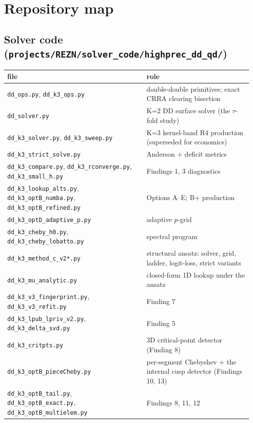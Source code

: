\chapter{Repository map}

\section{Solver code (\texttt{projects/REZN/solver\_code/highprec\_dd\_qd/})}
\begin{center}\small\begin{tabularx}{\linewidth}{lX}\toprule
file & role \\
\midrule
\texttt{dd\_ops.py}, \texttt{dd\_k3\_ops.py} & double-double primitives; exact CRRA clearing bisection \\
\texttt{dd\_solver.py} & K=2 DD surface solver (the $\tau$-fold study) \\
\texttt{dd\_k3\_solver.py}, \texttt{dd\_k3\_sweep.py} & K=3 kernel-band R4 production (superseded for economics) \\
\texttt{dd\_k3\_strict\_solve.py} & \strict{} Anderson + deficit metrics \\
\texttt{dd\_k3\_compare.py}, \texttt{dd\_k3\_rconverge.py}, \texttt{dd\_k3\_small\_h.py} & Findings 1, 3 diagnostics \\
\texttt{dd\_k3\_lookup\_alts.py}, \texttt{dd\_k3\_optB\_numba.py}, \texttt{dd\_k3\_optB\_refined.py} & Options A--E; B+ production \\
\texttt{dd\_k3\_optD\_adaptive\_p.py} & adaptive $p$-grid \\
\texttt{dd\_k3\_cheby\_h0.py}, \texttt{dd\_k3\_cheby\_lobatto.py} & spectral program \\
\texttt{dd\_k3\_method\_c\_v2*.py} & structural ansatz: solver, grid, ladder, logit-loss, strict variants \\
\texttt{dd\_k3\_mu\_analytic.py} & closed-form 1D lookup under the ansatz \\
\texttt{dd\_k3\_v3\_fingerprint.py}, \texttt{dd\_k3\_v3\_refit.py} & Finding 7 \\
\texttt{dd\_k3\_lpub\_lpriv\_v2.py}, \texttt{dd\_k3\_delta\_svd.py} & Finding 5 \\
\texttt{dd\_k3\_critpts.py} & 3D critical-point detector (Finding 8) \\
\texttt{dd\_k3\_optB\_pieceCheby.py} & per-segment Chebyshev + the internal cusp detector (Findings 10, 13) \\
\texttt{dd\_k3\_optB\_tail.py}, \texttt{dd\_k3\_optB\_exact.py}, \texttt{dd\_k3\_optB\_multielem.py} & Findings 8, 11, 12 \\

\end{tabularx}
\end{center}
